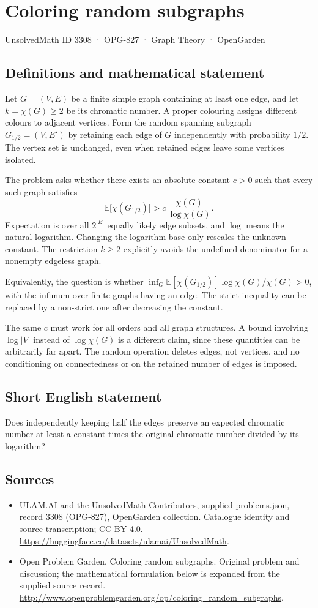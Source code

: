 \documentclass[11pt,a4paper]{article}
\begin{document}
\section*{Coloring random subgraphs}\label{3308}
{\small UnsolvedMath ID 3308 · OPG-827 · Graph Theory · OpenGarden}
\subsection{Definitions and mathematical statement}
Let $G=(V,E)$ be a finite simple graph containing at least one edge,
and let $k=\chi(G)\ge2$ be its chromatic number. A proper colouring
assigns different colours to adjacent vertices. Form the random
spanning subgraph $G_{1/2}=(V,E')$ by retaining each edge of $G$
independently with probability $1/2$. The vertex set is unchanged,
even when retained edges leave some vertices isolated.

The problem asks whether there exists an absolute constant $c>0$
such that every such graph satisfies
\[
                   \mathbb E\bigl[\chi(G_{1/2})\bigr]
                      >c\,\frac{\chi(G)}{\log\chi(G)}.
\]
Expectation is over all $2^{|E|}$ equally likely edge subsets, and
$\log$ means the natural logarithm. Changing the logarithm base only
rescales the unknown constant. The restriction $k\ge2$ explicitly
avoids the undefined denominator for a nonempty edgeless graph.

Equivalently, the question is whether
$\inf_G\mathbb E[\chi(G_{1/2})]\log\chi(G)/\chi(G)>0$, with the
infimum over finite graphs having an edge. The strict inequality can
be replaced by a non-strict one after decreasing the constant.

The same $c$ must work for all orders and all graph structures. A
bound involving $\log|V|$ instead of $\log\chi(G)$ is a different
claim, since these quantities can be arbitrarily far apart. The
random operation deletes edges, not vertices, and no conditioning
on connectedness or on the retained number of edges is imposed.
\subsection{Short English statement}
Does independently keeping half the edges preserve an expected chromatic number at least a constant times the original chromatic number divided by its logarithm?
\subsection{Sources}
\begin{itemize}
\item[S1] ULAM.AI and the UnsolvedMath Contributors, supplied problems.json, record 3308 (OPG-827), OpenGarden collection. Catalogue identity and source transcription; CC BY 4.0.
\url{https://huggingface.co/datasets/ulamai/UnsolvedMath}.
\item[S2] Open Problem Garden, Coloring random subgraphs. Original problem and discussion; the mathematical formulation below is expanded from the supplied source record.
\url{http://www.openproblemgarden.org/op/coloring_random_subgraphs}.
\end{itemize}
\end{document}
